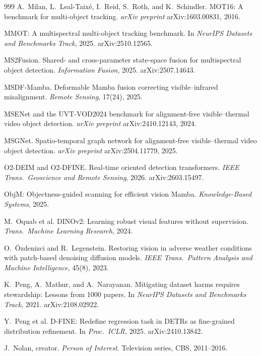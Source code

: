 \begin{thebibliography}{999}
A.~Milan, L.~Leal-Taix\'e, I.~Reid, S.~Roth, and K.~Schindler.
MOT16: A benchmark for multi-object tracking.
\textit{arXiv preprint} arXiv:1603.00831, 2016.

MMOT: A multispectral multi-object tracking benchmark.
In \textit{NeurIPS Datasets and Benchmarks Track}, 2025. arXiv:2510.12565.

MS2Fusion. Shared- and cross-parameter state-space fusion for multispectral
object detection. \textit{Information Fusion}, 2025. arXiv:2507.14643.

MSDF-Mamba. Deformable Mamba fusion correcting visible--infrared misalignment.
\textit{Remote Sensing}, 17(24), 2025.

MSENet and the UVT-VOD2024 benchmark for alignment-free visible--thermal video
object detection. \textit{arXiv preprint} arXiv:2410.12143, 2024.

MSGNet. Spatio-temporal graph network for alignment-free visible--thermal video
object detection. \textit{arXiv preprint} arXiv:2504.11779, 2025.

O2-DEIM and O2-DFINE. Real-time oriented detection transformers.
\textit{IEEE Trans.\ Geoscience and Remote Sensing}, 2026. arXiv:2603.15497.

ObjM: Objectness-guided scanning for efficient vision Mamba.
\textit{Knowledge-Based Systems}, 2025.

M.~Oquab et al.
DINOv2: Learning robust visual features without supervision.
\textit{Trans.\ Machine Learning Research}, 2024.

O.~\"Ozdenizci and R.~Legenstein.
Restoring vision in adverse weather conditions with patch-based denoising
diffusion models. \textit{IEEE Trans.\ Pattern Analysis and Machine
Intelligence}, 45(8), 2023.

K.~Peng, A.~Mathur, and A.~Narayanan.
Mitigating dataset harms requires stewardship: Lessons from 1000 papers.
In \textit{NeurIPS Datasets and Benchmarks Track}, 2021. arXiv:2108.02922.

Y.~Peng et al.
D-FINE: Redefine regression task in DETRs as fine-grained distribution
refinement. In \textit{Proc.\ ICLR}, 2025. arXiv:2410.13842.

J.~Nolan, creator.
\textit{Person of Interest}. Television series, CBS, 2011--2016.


\end{thebibliography}
